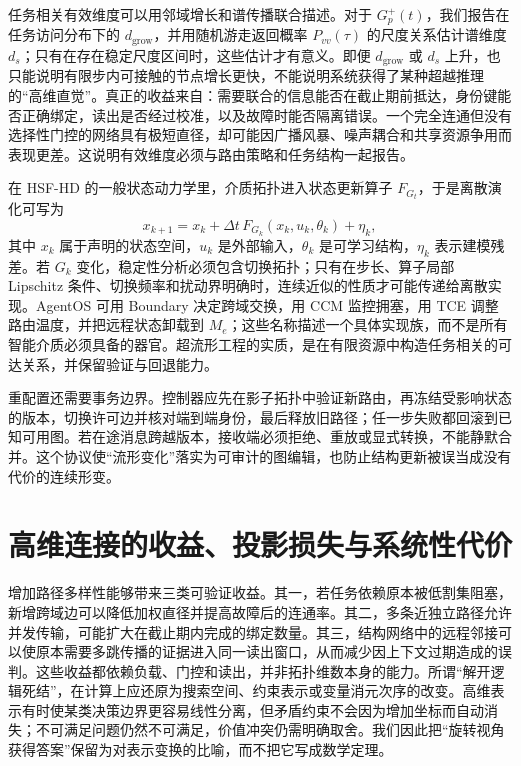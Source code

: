 任务相关有效维度可以用邻域增长和谱传播联合描述。对于 $G_p^+(t)$，我们报告在任务访问分布下的 $d_{\mathrm{grow}}$，并用随机游走返回概率 $P_{vv}(\tau)$ 的尺度关系估计谱维度 $d_s$；只有在存在稳定尺度区间时，这些估计才有意义。即便 $d_{\mathrm{grow}}$ 或 $d_s$ 上升，也只能说明有限步内可接触的节点增长更快，不能说明系统获得了某种超越推理的“高维直觉”。真正的收益来自：需要联合的信息能否在截止期前抵达，身份键能否正确绑定，读出是否经过校准，以及故障时能否隔离错误。一个完全连通但没有选择性门控的网络具有极短直径，却可能因广播风暴、噪声耦合和共享资源争用而表现更差。这说明有效维度必须与路由策略和任务结构一起报告。

在 HSF-HD 的一般状态动力学里，介质拓扑进入状态更新算子 $F_{G_t}$，于是离散演化可写为
\[
x_{k+1}=x_k+\Delta t\,F_{G_k}(x_k,u_k,\theta_k)+\eta_k,
\]
其中 $x_k$ 属于声明的状态空间，$u_k$ 是外部输入，$\theta_k$ 是可学习结构，$\eta_k$ 表示建模残差。若 $G_k$ 变化，稳定性分析必须包含切换拓扑；只有在步长、算子局部 Lipschitz 条件、切换频率和扰动界明确时，连续近似的性质才可能传递给离散实现。AgentOS 可用 Boundary 决定跨域交换，用 CCM 监控拥塞，用 TCE 调整路由温度，并把远程状态卸载到 $M_e$；这些名称描述一个具体实现族，而不是所有智能介质必须具备的器官。超流形工程的实质，是在有限资源中构造任务相关的可达关系，并保留验证与回退能力。

重配置还需要事务边界。控制器应先在影子拓扑中验证新路由，再冻结受影响状态的版本，切换许可边并核对端到端身份，最后释放旧路径；任一步失败都回滚到已知可用图。若在途消息跨越版本，接收端必须拒绝、重放或显式转换，不能静默合并。这个协议使“流形变化”落实为可审计的图编辑，也防止结构更新被误当成没有代价的连续形变。

\section{高维连接的收益、投影损失与系统性代价}
\label{sec:section_2453}

增加路径多样性能够带来三类可验证收益。其一，若任务依赖原本被低割集阻塞，新增跨域边可以降低加权直径并提高故障后的连通率。其二，多条近独立路径允许并发传输，可能扩大在截止期内完成的绑定数量。其三，结构网络中的远程邻接可以使原本需要多跳传播的证据进入同一读出窗口，从而减少因上下文过期造成的误判。这些收益都依赖负载、门控和读出，并非拓扑维数本身的能力。所谓“解开逻辑死结”，在计算上应还原为搜索空间、约束表示或变量消元次序的改变。高维表示有时使某类决策边界更容易线性分离，但矛盾约束不会因为增加坐标而自动消失；不可满足问题仍然不可满足，价值冲突仍需明确取舍。我们因此把“旋转视角获得答案”保留为对表示变换的比喻，而不把它写成数学定理。

